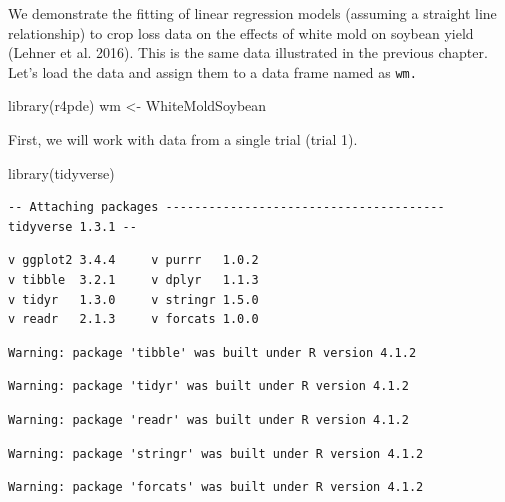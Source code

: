 \documentclass[
  letterpaper,
]{book}
\newenvironment{Shaded}{\begin{snugshade}}{\end{snugshade}}
\newcommand{\FunctionTok}[1]{\textcolor[rgb]{0.28,0.35,0.67}{#1}}
\newcommand{\NormalTok}[1]{\textcolor[rgb]{0.00,0.23,0.31}{#1}}
\newcommand{\OtherTok}[1]{\textcolor[rgb]{0.00,0.23,0.31}{#1}}
\begin{document}
We demonstrate the fitting of linear regression models (assuming a
straight line relationship) to crop loss data on the effects of white
mold on soybean yield (Lehner et al. 2016). This is the same data
illustrated in the previous chapter. Let's load the data and assign them
to a data frame named as \texttt{wm.}

\begin{Shaded}
\begin{Highlighting}[]
\FunctionTok{library}\NormalTok{(r4pde)}
\NormalTok{wm }\OtherTok{\textless{}{-}}\NormalTok{ WhiteMoldSoybean}
\end{Highlighting}
\end{Shaded}

First, we will work with data from a single trial (trial 1).

\begin{Shaded}
\begin{Highlighting}[]
\FunctionTok{library}\NormalTok{(tidyverse)}
\end{Highlighting}
\end{Shaded}

\begin{verbatim}
-- Attaching packages --------------------------------------- tidyverse 1.3.1 --
\end{verbatim}

\begin{verbatim}
v ggplot2 3.4.4     v purrr   1.0.2
v tibble  3.2.1     v dplyr   1.1.3
v tidyr   1.3.0     v stringr 1.5.0
v readr   2.1.3     v forcats 1.0.0
\end{verbatim}

\begin{verbatim}
Warning: package 'tibble' was built under R version 4.1.2
\end{verbatim}

\begin{verbatim}
Warning: package 'tidyr' was built under R version 4.1.2
\end{verbatim}

\begin{verbatim}
Warning: package 'readr' was built under R version 4.1.2
\end{verbatim}

\begin{verbatim}
Warning: package 'stringr' was built under R version 4.1.2
\end{verbatim}

\begin{verbatim}
Warning: package 'forcats' was built under R version 4.1.2
\end{verbatim}
\end{document}
